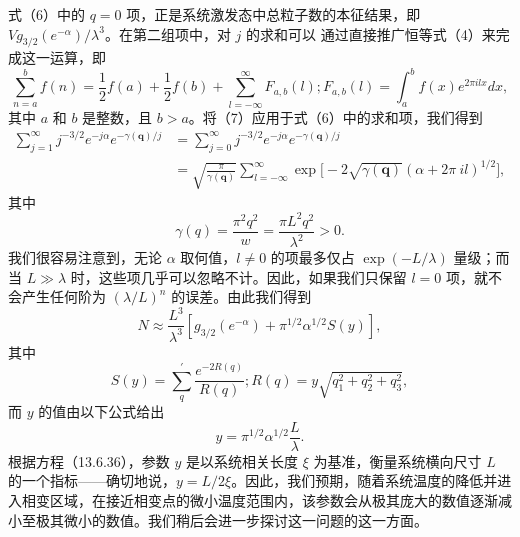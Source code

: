 式（6）中的 \(q=0\) 项，正是系统激发态中总粒子数的本征结果，即 \(Vg_{3/2}(e^{-\alpha})/\lambda^{3}\)。在第二组项中，对 \(j\) 的求和可以
通过直接推广恒等式（4）来完成这一运算，即
\begin{equation}\tag{17.6.8}\label{eq:17.6.8}
\sum _ { n = a } ^{b} f ( n ) = \frac { 1 } { 2 } f ( a ) + \frac { 1 } { 2 } f ( b ) + \sum _ { l = - \infty } ^{\infty} F _ { a , b } ( l ) ;  F _ { a , b } ( l ) = \int _ { a } ^{b} f ( x ) e ^{2 \pi i l x} d x ,
\end{equation}
其中 \(a\) 和 \(b\) 是整数，且 \(b > a\)。将（7）应用于式（6）中的求和项，我们得到
\begin{equation}\tag{17.6.9}\label{eq:17.6.9}
\begin{aligned}\sum_{j=1}^{\infty}j^{-3/2}e^{-j\alpha}e^{-\gamma(\boldsymbol{q})/j}&=\sum_{j=0}^{\infty}j^{-3/2}e^{-j\alpha}e^{-\gamma(\boldsymbol{q})/j}\\&=\sqrt{\frac{\pi}{\gamma(\boldsymbol{q})}}\sum_{l=-\infty}^{\infty}\exp\biggl[-2\sqrt{\gamma(\boldsymbol{q})}\left(\alpha+2\pi\:il\right)^{1/2}\biggr],\end{aligned}
\end{equation}
其中
\begin{equation}\tag{17.6.10}\label{eq:17.6.10}
\gamma ( q ) = \frac { \pi ^{2} q ^{2} } { w } = \frac { \pi L ^{2} q ^{2} } { \lambda ^{2} } > 0 .
\end{equation}
我们很容易注意到，无论 \(\alpha\) 取何值，\(l \neq 0\) 的项最多仅占 \(\exp(-L/\lambda)\) 量级；而当 \(L \gg \lambda\) 时，这些项几乎可以忽略不计。因此，如果我们只保留 \(l=0\) 项，就不会产生任何阶为 \((\lambda/L)^n\) 的误差。由此我们得到
\begin{equation}\tag{17.6.11}\label{eq:17.6.11}
N \approx \frac { L ^{3} } { \lambda ^{3} } \left[ g _ { 3 / 2 } \left( e ^{- \alpha} \right) + \pi ^{1 / 2} \alpha ^{1 / 2} S \left( y \right) \right] ,
\end{equation}
其中
\begin{equation}\tag{17.6.12}\label{eq:17.6.12}
S ( y ) = \sum _ { q } ^{\prime} \frac { e ^{- 2 R ( q )} } { R ( q ) } ;  R ( q ) = y \sqrt { q _ { 1 } ^{2} + q _ { 2 } ^{2} + q _ { 3 } ^{2} } ,
\end{equation}
而 \(y\) 的值由以下公式给出
\begin{equation}\tag{17.6.13}\label{eq:17.6.13}
y = \pi ^{1 / 2} \alpha ^{1 / 2} \frac { L } { \lambda } .
\end{equation}
根据方程（13.6.36），参数 \(y\) 是以系统相关长度 \(\xi\) 为基准，衡量系统横向尺寸 \(L\) 的一个指标——确切地说，\(y = L/2\xi\)。因此，我们预期，随着系统温度的降低并进入相变区域，在接近相变点的微小温度范围内，该参数会从极其庞大的数值逐渐减小至极其微小的数值。我们稍后会进一步探讨这一问题的这一方面。
